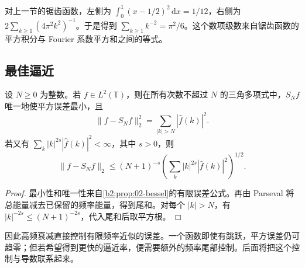 对上一节的锯齿函数，左侧为 \(\int_0^1(x-1/2)^2\,\mathrm{d}x=1/12\)，右侧为 \(2\sum_{k\geq1}(4\pi^2k^2)^{-1}\)。于是得到 \(\sum_{k\geq1}k^{-2}=\pi^2/6\)。这个数项级数来自锯齿函数的平方积分与 Fourier 系数平方和之间的等式。

\subsection{最佳逼近}
\label{b2:subsec:020304}

\begin{proposition}\label{b2:prop:02-best-approximation}
设 \(N\geq0\) 为整数。若 \(f\in L^2(\mathbb T)\)，则在所有次数不超过 \(N\) 的三角多项式中，\(S_Nf\) 唯一地使平方误差最小，且
\[
 \|f-S_Nf\|_2^2=\sum_{|k|>N}|\widehat f(k)|^2.
\]
若又有 \(\sum_k|k|^{2s}|\widehat f(k)|^2<\infty\)，其中 \(s>0\)，则
\[
 \|f-S_Nf\|_2
 \leq (N+1)^{-s}\left(\sum_k|k|^{2s}|\widehat f(k)|^2\right)^{1/2}.
\]
\end{proposition}
\begin{proof}
最小性和唯一性来自\cref{b2:prop:02-bessel}的有限误差公式。再由 Parseval 将总能量减去已保留的频率能量，得到尾和。对每个 \(|k|>N\)，有 \(|k|^{-2s}\leq(N+1)^{-2s}\)，代入尾和后取平方根。
\end{proof}

因此高频衰减直接控制有限频率近似的误差。一个函数即使有跳跃，平方误差仍可趋零；但若希望得到更快的逼近率，便需要额外的频率尾部控制。后面将把这个控制与导数联系起来。
